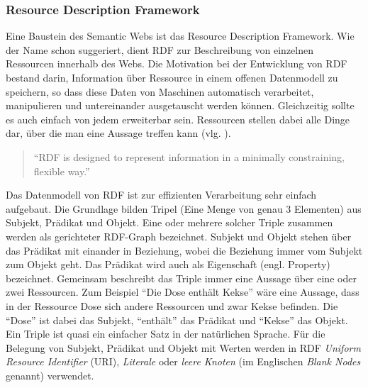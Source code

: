 \subsubsection{Resource Description Framework} %
\label{ssub:resource_description_framework}

Eine Baustein des Semantic Webs ist das Resource Description Framework. Wie der Name schon suggeriert, dient RDF zur Beschreibung von einzelnen Ressourcen innerhalb des Webs. Die Motivation bei der Entwicklung von RDF bestand darin, Information über Ressource in einem offenen Datenmodell zu speichern, so dass diese Daten von Maschinen automatisch verarbeitet, manipulieren und untereinander ausgetauscht werden können. Gleichzeitig sollte es auch einfach von jedem erweiterbar sein. Ressourcen stellen dabei alle Dinge dar, über die man eine Aussage treffen kann (vlg. \cite{Klyne2004,Manola2004}). 

\begin{quote}
\enquote{RDF is designed to represent information in a minimally constraining, flexible way.}\cite[Abschnitt 2.1 \enquote{Motivation}]{Klyne2004}
\end{quote}

Das Datenmodell von RDF ist zur effizienten Verarbeitung sehr einfach aufgebaut. Die Grundlage bilden Tripel (Eine Menge von genau 3 Elementen) aus Subjekt, Prädikat und Objekt. Eine oder mehrere solcher Triple zusammen werden als gerichteter RDF-Graph bezeichnet. Subjekt und Objekt stehen über das Prädikat mit einander in Beziehung, wobei die Beziehung immer vom Subjekt zum Objekt geht. Das Prädikat wird auch als Eigenschaft (engl. Property) bezeichnet. Gemeinsam beschreibt das Triple immer eine Aussage über eine oder zwei Ressourcen. Zum Beispiel \enquote{Die Dose enthält Kekse} wäre eine Aussage, dass in der Ressource Dose sich andere Ressourcen und zwar Kekse befinden. Die \enquote{Dose} ist dabei das Subjekt, \enquote{enthält} das Prädikat und \enquote{Kekse} das Objekt. Ein Triple ist quasi ein einfacher Satz in der natürlichen Sprache. Für die Belegung von Subjekt, Prädikat und Objekt mit Werten werden in RDF \emph{Uniform Resource Identifier} (URI), \emph{Literale} oder \emph{leere Knoten} (im Englischen \emph{Blank Nodes} genannt) verwendet. 

